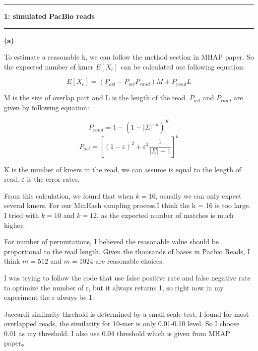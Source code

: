 \documentclass[11pt]{article}
\newcommand\question[2]{\vspace{.25in}\hrule\textbf{#1: #2}\vspace{.5em}\hrule\vspace{.10in}}
\renewcommand\part[1]{\vspace{.10in}\textbf{(#1)}}
\begin{document}
\raggedright
\newcommand\NAME{Nan Du}  %
\newcommand\ANDREWID{dunan}     %
\newcommand\HWNUM{2}              %


\question{1}{simulated PacBio reads} 

\part{a} 

To estimate a reasonable k, we can follow the method section in MHAP paper. So the expected number of kmer $ E[X_c] $ can be calculated use following equation:

\[ E[X_c] = (P_{ovl} - P_{ovl} P_{rand})M + P_{rand}L \]

M is the size of overlap part and L is the length of the read. $ P_{ovl} $ and $ P_{rand} $ are given by following equation:

\[ P_{rand} = 1 - (1 - |\varSigma|^{-k})^{K} \]
\[ P_{ovl} = [(1-\varepsilon)^{2}+\varepsilon^{2}\frac{1}{|\varSigma| - 1}]^{k} \]

K is the number of kmers in the read, we can assume is equal to the length of read, $ \varepsilon $ is the error rates.

From this calculation, we found that when $ k = 16 $, usually we can only expect several kmers. For our MinHash sampling process,I think the k = 16 is too large. I tried with $ k = 10 $ and $ k = 12 $, as the expected number of matches is much higher.

For number of permutations, I believed the reasonable value should be proportional to the read length. Given the thousands of bases in Pacbio Reads, I think $ m = 512 $ and $ m = 1024 $ are reasonable choices.

I was trying to follow the code that use false positive rate and false negative rate to optimize the number of r, but it always returns 1, so right now in my experiment the r always be 1.

Jaccardi similarity threhold is determined by a small scale test, I found for most overlapped reads, the similarity for 10-mer is only 0.01-0.10 level. So I choose 0.01 as my threshold. I also use 0.04 threshold which is given from MHAP paper。
\end{document}
